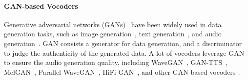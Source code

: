\documentclass{article}
\begin{document}

\paragraph{GAN-based Vocoders}
Generative adversarial networks (GANs)~\cite{goodfellow2014generative} have been widely used in data generation tasks, such as image generation~\cite{goodfellow2014generative,zhu2017unpaired}, text generation~\cite{yu2017seqgan}, and audio generation~\cite{donahue2018adversarial}. GAN consists a generator for data generation, and a discriminator to judge the authenticity of the generated data. A lot of vocoders leverage GAN to ensure the audio generation quality, including WaveGAN~\cite{donahue2018adversarial}, GAN-TTS~\cite{binkowski2019high}, MelGAN~\cite{kumar2019melgan}, Parallel WaveGAN~\cite{yamamoto2020parallel}, HiFi-GAN~\cite{kong2020hifi}, and other GAN-based vocoders~\cite{yamamoto2019probability,wu2020quasi,song2021improved,you2021gan,wang2021improve,jang2020universal}. 

\end{document}
